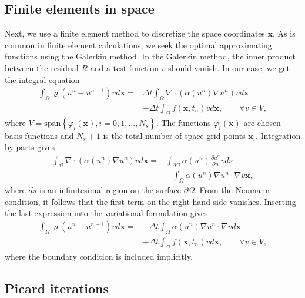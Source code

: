 \documentclass[twoside]{article}
\begin{document}
\subsection{Finite elements in space}

Next, we use a finite element method to discretize the space coordinates $\mathbf{x}$. As is common in finite element calculations, we seek the optimal approximating functions using the Galerkin method. In the Galerkin method, the inner product between the residual $R$ and a test function $v$ should vanish. In our case, we get the integral equation
\begin{align}
  \int_{\Omega }\varrho (u^{n} - u^{n-1})vd\mathbf{x} =& \Delta t \int_{\Omega }\nabla \cdot \left( \alpha(u^{n})\nabla u^{n}\right)vd\mathbf{x} \nonumber \\
  & + \Delta t \int_{\Omega }f(\mathbf{x}, t_{n})vd\mathbf{x}, \qquad \forall v \in V,
\end{align}
where $V = \text{span}\left\{ \varphi_{i}(\mathbf{x}), i = 0, 1, \dots, N_{s}\right\}$. The functions $\varphi_{i}(\mathbf{x})$ are chosen basis functions and $N_{s} + 1$ is the total number of space grid points $\mathbf{x}_{i}$. Integration by parts gives
\begin{align}
  \int_{\Omega }\nabla \cdot \left( \alpha(u^{n})\nabla u^{n}\right) vd\mathbf{x} =& \int_{\partial \Omega }\alpha(u^{n})\frac{\partial u^{n}}{\partial n}v ds \nonumber \\
  & - \int_{\Omega }\alpha(u^{n})\nabla u^{n}\cdot \nabla v\mathbf{x},
\end{align}
where $ds$ is an infinitesimal region on the surface $\partial \Omega $. From the Neumann condition, it follows that the first term on the right hand side vanishes. Inserting the last expression into the variational formulation gives
\begin{align}
  \int_{\Omega }\varrho (u^{n} - u^{n-1})v d\mathbf{x} =& -\Delta t \int_{\Omega }\alpha(u^{n})\nabla u^{n}\cdot \nabla v d\mathbf{x} \nonumber \\
  & + \Delta t \int_{\Omega }f(\mathbf{x}, t_{n})v d\mathbf{x}, \qquad \forall v \in V,
\end{align}
where the boundary condition is included implicitly.
 
\subsection{Picard iterations}
\end{document}
